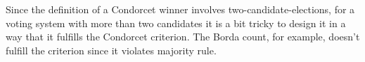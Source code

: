 Since the definition of a Condorcet winner involves two-candidate-elections, for a voting system with more than two candidates it is a bit tricky to design it in a way that it fulfills the Condorcet criterion. The Borda count, for example, doesn't fulfill the criterion since it violates majority rule. \\













